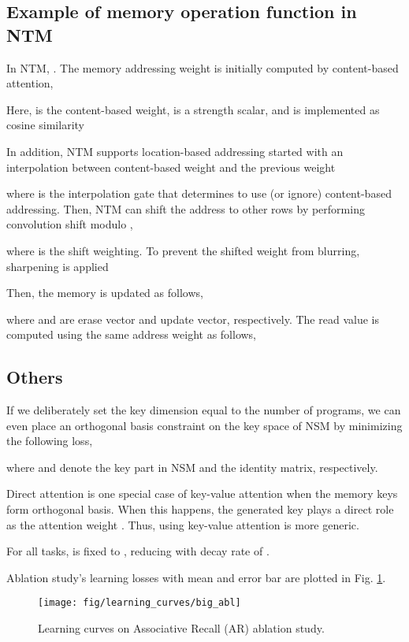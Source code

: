 \documentclass[english]{article}
\begin{document}
\subsection{Example of memory operation function in NTM\label{subsec:Example-of-memory}}

In NTM, .
The memory addressing weight is initially computed by content-based
attention,


Here,  is the content-based
weight,  is a strength scalar, and  is implemented
as cosine similarity


In addition, NTM supports location-based addressing started with an
interpolation between content-based weight and the previous weight


where  is the interpolation gate that determines to use (or
ignore) content-based addressing. Then, NTM can shift the address
to other rows by performing convolution shift modulo ,


where  is the shift weighting. To prevent the shifted weight
from blurring, sharpening is applied


Then, the memory is updated as follows,


where  and 
are erase vector and update vector, respectively. The read value is
computed using the same address weight as follows,




\subsection{Others}

If we deliberately set the key dimension equal to the number of programs,
we can even place an orthogonal basis constraint on the key space
of NSM by minimizing the following loss, 


where  and  denote the key part in
NSM and the identity matrix, respectively. 

Direct attention is one special case of key-value attention when the
memory keys form orthogonal basis. When this happens, the generated
key  plays a direct role as the attention weight .
Thus, using key-value attention is more generic.

For all tasks,  is fixed to , reducing with decay
rate of . 

Ablation study's learning losses with mean and error bar are plotted
in Fig. \ref{fig:Learning-curves-on-2}.

\begin{figure}

\begin{centering}
\texttt{[image: fig/learning\_curves/big\_abl]}
\par\end{centering}
\caption{Learning curves on Associative Recall (AR) ablation study.\label{fig:Learning-curves-on-2}}

\end{figure}

 
\end{document}
